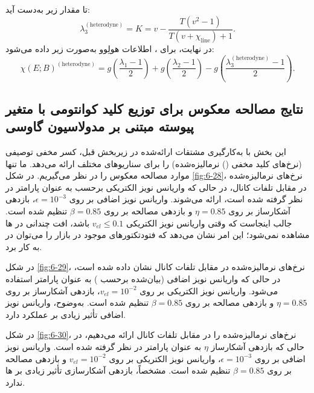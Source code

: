 تا مقدار زیر به‌دست آید:
\begin{equation}
	\lambda_3^{(\text{heterodyne})} = K = v - \frac{T(v^2 - 1)}{T(v + \chi_{\text{line}}) + 1}.
	\label{eq:6-126}
\end{equation}
در نهایت، برای ، اطلاعات هولِوو به‌صورت زیر داده می‌شود:
\begin{equation}
	\chi(E; B)^{(\text{heterodyne})} = g\left(\frac{\lambda_1 - 1}{2}\right) + g\left(\frac{\lambda_2 - 1}{2}\right) - g\left(\frac{\lambda_3^{(\text{heterodyne})} - 1}{2}\right).
	\label{eq:6-127}
\end{equation}

\subsection{نتایج مصالحه معکوس برای توزیع کلید کوانتومی با متغیر پیوسته مبتنی بر مدولاسیون گاوسی}
\label{sec:6-10-5}
این بخش با به‌کارگیری مشتقات ارائه‌شده در زیربخش قبل، کسر مخفی توصیفی (نرخ‌های کلید مخفی () نرمالیزه‌شده) را برای سناریوهای مختلف ارائه می‌دهد. ما تنها موارد مصالحه معکوس را در نظر می‌گیریم. در شکل \ref{fig:6-28}، نرخ‌های  نرمالیزه‌شده در مقابل تلفات کانال، در حالی که واریانس نویز الکتریکی برحسب  به عنوان پارامتر در نظر گرفته شده است، ارائه می‌شوند. واریانس نویز اضافی بر روی $\epsilon = 10^{-3}$، بازدهی آشکارساز بر روی $\eta = 0.85$ و بازدهی مصالحه بر روی $\beta = 0.85$ تنظیم شده است. جالب اینجاست که وقتی واریانس نویز الکتریکی $v_{el} \leq 0.1$ باشد، افت چندانی در ها مشاهده نمی‌شود؛ این امر نشان می‌دهد که فتودتکتورهای  موجود در بازار را می‌توان در  به کار برد.

در شکل \ref{fig:6-29}، نرخ‌های  نرمالیزه‌شده در مقابل تلفات کانال نشان داده شده است، در حالی که واریانس نویز اضافی (بیان‌شده برحسب ) به عنوان پارامتر استفاده می‌شود. واریانس نویز الکتریکی بر روی $v_{el} = 10^{-2}$، بازدهی آشکارساز بر روی $\eta = 0.85$ و بازدهی مصالحه بر روی $\beta = 0.85$ تنظیم شده است. به‌وضوح، واریانس نویز اضافی تأثیر زیادی بر عملکرد  دارد.

در شکل \ref{fig:6-30}، نرخ‌های  نرمالیزه‌شده را در مقابل تلفات کانال ارائه می‌دهیم، در حالی که بازدهی آشکارساز $\eta$ به عنوان پارامتر در نظر گرفته شده است. واریانس نویز اضافی بر روی $\epsilon = 10^{-3}$، واریانس نویز الکتریکی بر روی $v_{el} = 10^{-2}$ و بازدهی مصالحه بر روی $\beta = 0.85$ تنظیم شده است. مشخصاً، بازدهی آشکارسازی تأثیر زیادی بر ها ندارد.

